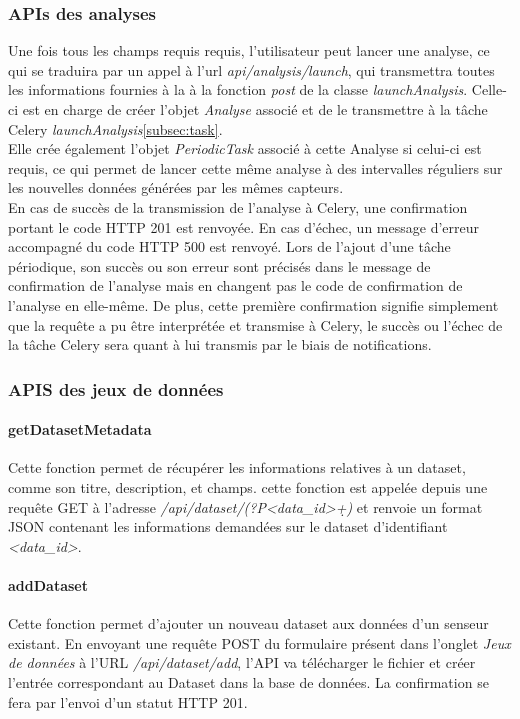 \documentclass[a4paper]{report}
\begin{document}
\subsubsection{APIs des analyses}
Une fois tous les champs requis requis, l'utilisateur peut lancer une analyse, ce qui se traduira par un appel à l'url \emph{api/analysis/launch}, qui transmettra toutes les informations fournies à la à la fonction \emph{post} de la classe \emph{launchAnalysis}. Celle-ci est en charge de créer l'objet \emph{Analyse} associé et de le transmettre à la tâche Celery \emph{launchAnalysis}\ref{subsec:task}.\\

Elle crée également l'objet \emph{PeriodicTask} associé à cette Analyse si celui-ci est requis, ce qui permet de lancer cette même analyse à des intervalles réguliers sur les nouvelles données générées par les mêmes capteurs.\\

En cas de succès de la transmission de l'analyse à Celery, une confirmation portant le code HTTP 201 est renvoyée. En cas d'échec, un message d'erreur accompagné du code HTTP 500 est renvoyé. Lors de l'ajout d'une tâche périodique, son succès ou son erreur sont précisés dans le message de confirmation de l'analyse mais en changent pas le code de confirmation de l'analyse en elle-même. De plus, cette première confirmation signifie simplement que la requête a pu être interprétée et transmise à Celery, le succès ou l'échec de la tâche Celery sera quant à lui transmis par le biais de notifications.

\subsubsection{APIS des jeux de données}

\paragraph{getDatasetMetadata} 
Cette fonction permet de récupérer les informations relatives à un dataset, comme son titre, description, et champs. cette fonction est appelée depuis une requête GET à l'adresse \emph{/api/dataset/(?P<data\_id>\d+)} et renvoie un format JSON contenant les informations demandées sur le dataset d'identifiant \emph{<data\_id>}.

\paragraph{addDataset} 
Cette fonction permet d'ajouter un nouveau dataset aux données d'un senseur existant. En envoyant une requête POST du formulaire présent dans l'onglet \emph{Jeux de données} à l'URL \emph{/api/dataset/add}, l'API va télécharger le fichier et créer l'entrée correspondant au Dataset dans la base de données. La confirmation se fera par l'envoi d'un statut HTTP 201.
\end{document}
